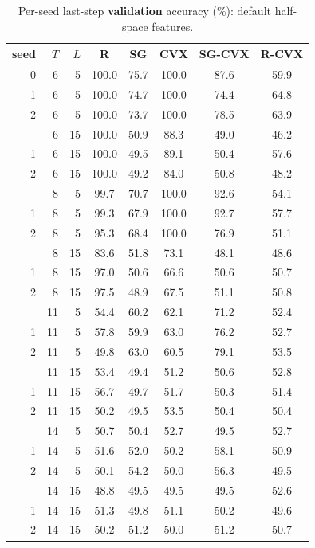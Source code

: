 \documentclass[11pt]{article}
\begin{document}
\begin{table}[p]
\centering
\caption{Per-seed last-step \textbf{validation} accuracy (\%): default half-space features.}
\label{tab:xor-val-perseed-default}
\begin{tabular}{rrrccccc}
\toprule
seed & $T$ & $L$ & R & SG & CVX & SG-CVX & R-CVX \\
\midrule
0 & 6 & 5 & 100.0 & 75.7 & 100.0 & 87.6 & 59.9 \\
1 & 6 & 5 & 100.0 & 74.7 & 100.0 & 74.4 & 64.8 \\
2 & 6 & 5 & 100.0 & 73.7 & 100.0 & 78.5 & 63.9 \\
\addlinespace
0 & 6 & 15 & 100.0 & 50.9 & 88.3 & 49.0 & 46.2 \\
1 & 6 & 15 & 100.0 & 49.5 & 89.1 & 50.4 & 57.6 \\
2 & 6 & 15 & 100.0 & 49.2 & 84.0 & 50.8 & 48.2 \\
\addlinespace
0 & 8 & 5 & 99.7 & 70.7 & 100.0 & 92.6 & 54.1 \\
1 & 8 & 5 & 99.3 & 67.9 & 100.0 & 92.7 & 57.7 \\
2 & 8 & 5 & 95.3 & 68.4 & 100.0 & 76.9 & 51.1 \\
\addlinespace
0 & 8 & 15 & 83.6 & 51.8 & 73.1 & 48.1 & 48.6 \\
1 & 8 & 15 & 97.0 & 50.6 & 66.6 & 50.6 & 50.7 \\
2 & 8 & 15 & 97.5 & 48.9 & 67.5 & 51.1 & 50.8 \\
\addlinespace
0 & 11 & 5 & 54.4 & 60.2 & 62.1 & 71.2 & 52.4 \\
1 & 11 & 5 & 57.8 & 59.9 & 63.0 & 76.2 & 52.7 \\
2 & 11 & 5 & 49.8 & 63.0 & 60.5 & 79.1 & 53.5 \\
\addlinespace
0 & 11 & 15 & 53.4 & 49.4 & 51.2 & 50.6 & 52.8 \\
1 & 11 & 15 & 56.7 & 49.7 & 51.7 & 50.3 & 51.4 \\
2 & 11 & 15 & 50.2 & 49.5 & 53.5 & 50.4 & 50.4 \\
\addlinespace
0 & 14 & 5 & 50.7 & 50.4 & 52.7 & 49.5 & 52.7 \\
1 & 14 & 5 & 51.6 & 52.0 & 50.2 & 58.1 & 50.9 \\
2 & 14 & 5 & 50.1 & 54.2 & 50.0 & 56.3 & 49.5 \\
\addlinespace
0 & 14 & 15 & 48.8 & 49.5 & 49.5 & 49.5 & 52.6 \\
1 & 14 & 15 & 51.3 & 49.8 & 51.1 & 50.2 & 49.6 \\
2 & 14 & 15 & 50.2 & 51.2 & 50.0 & 51.2 & 50.7 \\
\bottomrule
\end{tabular}
\end{table}
\end{document}
